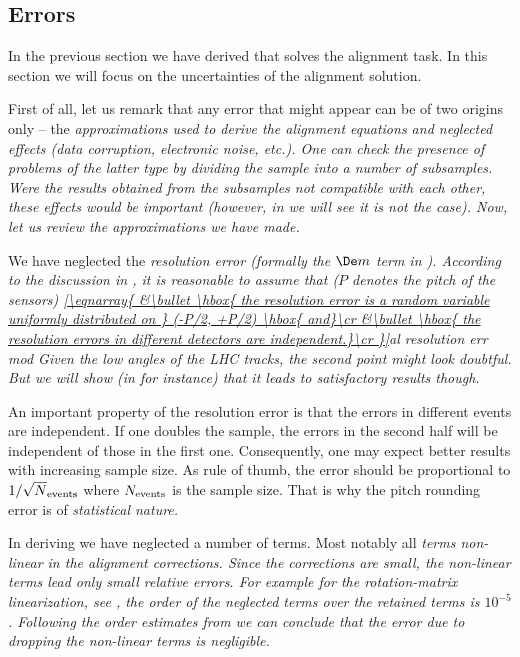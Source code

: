 \subsection[al err]{Errors}

In the previous section we have derived  that solves the alignment task. In this section we will focus on the uncertainties of the alignment solution.

First of all, let us remark that any error that might appear can be of two origins only -- the \em{approximations} used to derive the alignment equations and \em{neglected effects} (data corruption, electronic noise, etc.). One can check the presence of problems of the latter type by dividing the sample into a number of subsamples. Were the results obtained from the subsamples not compatible with each other, these effects would be important (however, in  we will see it is not the case). Now, let us review the approximations we have made.


\> We have neglected the \em{resolution error} (formally the $\De m$ term in ). According to the discussion in , it is reasonable to assume that ($P$ denotes the pitch of the sensors)
\eqref{\eqnarray{
	&\bullet \hbox{ the resolution error is a random variable uniformly distributed on } (-P/2, +P/2) \hbox{ and}\cr
	&\bullet \hbox{ the resolution errors in different detectors are independent.}\cr
}}{al resolution err mod}
Given the low angles of the LHC tracks, the second point might look doubtful. But we will show (in  for instance) that it leads to satisfactory results though.

\par\parindent\itindent\indent\hang
An important property of the resolution error is that the errors in different events are independent. If one doubles the sample, the errors in the second half will be independent of those in the first one. Consequently, one may expect better results with increasing sample size. As rule of thumb, the error should be proportional to $1/\sqrt N_{\rm events}$ where $N_{\rm events}$ is the sample size. That is why the pitch rounding error is of \em{statistical nature}.

\> In deriving  we have neglected a number of terms. Most notably all \em{terms non-linear in the alignment corrections}. Since the corrections are small, the non-linear terms lead only small relative errors. For example for the rotation-matrix linearization, see , the order of the neglected terms over the retained terms is $10^{-5}$. Following the order estimates from  we can conclude that the error due to dropping the non-linear terms is negligible.

